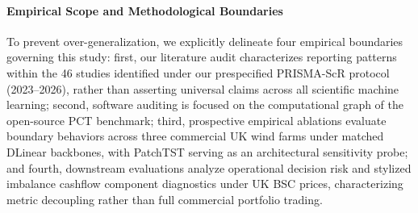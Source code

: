 \paragraph{Empirical Scope and Methodological Boundaries}
To prevent over-generalization, we explicitly delineate four empirical boundaries governing this study: first, our literature audit characterizes reporting patterns within the 46 studies identified under our prespecified PRISMA-ScR protocol (2023--2026), rather than asserting universal claims across all scientific machine learning; second, software auditing is focused on the computational graph of the open-source PCT benchmark; third, prospective empirical ablations evaluate boundary behaviors across three commercial UK wind farms under matched DLinear backbones, with PatchTST serving as an architectural sensitivity probe; and fourth, downstream evaluations analyze operational decision risk and stylized imbalance cashflow component diagnostics under UK BSC prices, characterizing metric decoupling rather than full commercial portfolio trading.
